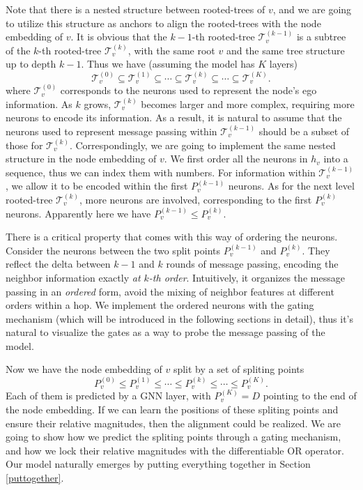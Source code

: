\documentclass{article}
\begin{document}
Note that there is a nested structure between rooted-trees of $v$, and we are going to utilize this structure as anchors to align the rooted-trees with the node embedding of $v$. It is obvious that the $k-1$-th rooted-tree $\mathcal{T}_{v}^{(k-1)}$ is a subtree of the $k$-th rooted-tree  $\mathcal{T}_{v}^{(k)}$, with the same root $v$ and the same tree structure up to depth $k-1$. Thus we have (assuming the model has $K$ layers)
\begin{equation} \label{relativemagnitude}
    \mathcal{T}_{v}^{(0)} \subseteq \mathcal{T}_{v}^{(1)} \subseteq \cdots \subseteq \mathcal{T}_{v}^{(k)} \subseteq \cdots \subseteq \mathcal{T}_{v}^{(K)}.
\end{equation}
where $\mathcal{T}_v^{(0)}$ corresponds to the neurons used to represent the node's ego information.
As $k$ grows, $\mathcal{T}_{v}^{(k)}$ becomes larger and more complex, requiring more neurons to encode its information. As a result, it is natural to assume that the neurons used to represent message passing within $\mathcal{T}_{v}^{(k-1)}$ should be a subset of those for $\mathcal{T}_{v}^{(k)}$. Correspondingly, we are going to implement the same nested structure in the node embedding of $v$. We first order all the neurons in $h_v$ into a sequence, thus we can index them with numbers. For information within $\mathcal{T}_{v}^{(k-1)}$, we allow it to be encoded within the first $P_v^{(k-1)}$ neurons. As for the next level rooted-tree $\mathcal{T}_{v}^{(k)}$, more neurons are involved, corresponding to the first $P_v^{(k)}$ neurons. Apparently here we have $P_v^{(k-1)} \leq P_v^{(k)}$.

There is a critical property that comes with this way of ordering the neurons. Consider the neurons between the two split points $P_v^{(k-1)}$ and $P_v^{(k)}$. They reflect the delta between $k-1$ and $k$ rounds of message passing, encoding the neighbor information exactly \textit{at $k$-th order}. Intuitively, it organizes the message passing in an \textit{ordered} form, avoid the mixing of neighbor features at different orders within a hop. We implement the ordered neurons with the gating mechanism (which will be introduced in the following sections in detail), thus it's natural to visualize the gates as a way to probe the message passing of the model.

Now we have the node embedding of $v$ split by a set of spliting points 
\begin{equation} \label{relativemagnitude2}
    P_v^{(0)} \leq P_v^{(1)} \leq \cdots \leq P_v^{(k)} \leq \cdots \leq P_v^{(K)}.
\end{equation}
Each of them is predicted by a GNN layer, with $P_v^{(K)}=D$ pointing to the end of the node embedding. If we can learn the positions of these spliting points and ensure their relative magnitudes, then the alignment could be realized. We are going to show how we predict the spliting points through a gating mechanism, and how we lock their relative magnitudes with the differentiable OR operator. Our model naturally emerges by putting everything together in Section \ref{puttogether}.
\end{document}
